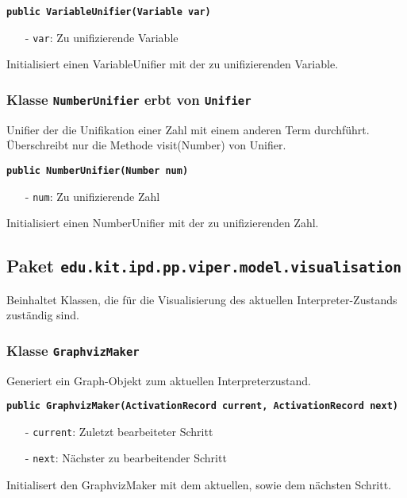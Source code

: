 \documentclass[parskip=full,11pt,twoside]{scrartcl}
\begin{document}
\textbf{\texttt{public VariableUnifier(Variable var)}}
\begin{itemize}[noitemsep]
	\item[-] \texttt{var}: Zu unifizierende Variable
\end{itemize}
Initialisiert einen VariableUnifier mit der zu unifizierenden Variable.

\subsubsection{Klasse \texttt{NumberUnifier} erbt von \texttt{Unifier}}

Unifier der die Unifikation einer Zahl mit einem anderen Term durchführt. Überschreibt nur die Methode visit(Number) von Unifier.

\textbf{\texttt{public NumberUnifier(Number num)}}
\begin{itemize}[noitemsep]
	\item[-] \texttt{num}: Zu unifizierende Zahl
\end{itemize}
Initialisiert einen NumberUnifier mit der zu unifizierenden Zahl.

\newpage
\subsection{Paket \texttt{edu.kit.ipd.pp.viper.model.visualisation}}

Beinhaltet Klassen, die für die Visualisierung des aktuellen Interpreter-Zustands zuständig sind.

\subsubsection{Klasse \texttt{GraphvizMaker}}

Generiert ein Graph-Objekt zum aktuellen Interpreterzustand.

\textbf{\texttt{public GraphvizMaker(ActivationRecord current, ActivationRecord next)}}
\begin{itemize}[noitemsep]
	\item[-] \texttt{current}: Zuletzt bearbeiteter Schritt
    \item[-] \texttt{next}: Nächster zu bearbeitender Schritt
\end{itemize}
Initialisert den GraphvizMaker mit dem aktuellen, sowie dem nächsten Schritt.
\end{document}
